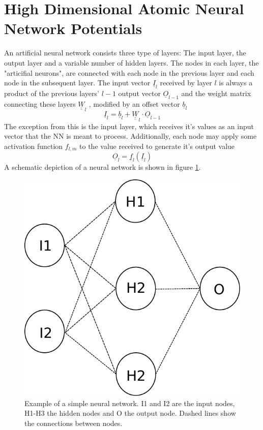 \documentclass[12pt,titlepage]{article}
\begin{document}
\section{High Dimensional Atomic Neural Network Potentials}
\label{structure}
\cite{Behler2007,Behler2011,Behler2015,Behler2017}
An artificial neural network consists three type of layers: The input layer, the output layer and a variable number of hidden layers. The nodes in each layer, the "articifial neurons", are connected with each node in the previous layer and each node in the subsequent layer. The input vector $\underline{I}_{l}$ received by layer $l$ is always a product of the previous layers' $l-1$ output vector $\underline{O}_{l-1}$ and the weight matrix connecting these layers $\underline{\underline{W}}_l$ , modified by an offset vector $\underline{b}_{l}$
\begin{equation}
\label{input value}
\underline{I}_{l} = \underline{b}_{l} + \underline{\underline{W}}_l \cdot \underline{O}_{l-1}
\end{equation}
The exception from this is the input layer, which receives it's values as an input vector that the NN is meant to process.
Additionally, each node may apply some activation function $f_{l, m}$ to the value received to generate it's output value
\begin{equation}
\label{input to output}
\underline{O}_{l} = \underline{f}_{l}(\underline{I}_{l})
\end{equation}
A schematic depiction of a neural network is shown in figure \ref{NN-Beispiel}. 
\newline


\begin{figure}
	\centering
	\includegraphics[width=0.6\linewidth]{NN-Beispiel.pdf}
	\caption{Example of a simple neural network. I1 and I2 are the input nodes, H1-H3 the hidden nodes and O the output node. Dashed lines show the connections between nodes.}
	\label{NN-Beispiel}
\end{figure}
\end{document}
